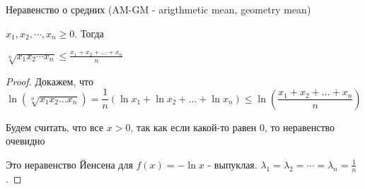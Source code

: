 \begin{theorem}
    Неравенство о средних (AM-GM - arigthmetic mean, geometry mean)

    $x_1, x_2, \cdots, x_n \geqslant 0$. Тогда

    $\sqrt[n]{x_1x_2\cdots x_n} \leqslant \frac{x_1+x_2+\dots+x_n}{n}$
\end{theorem}

\begin{proof}
    Докажем, что \[\ln (\sqrt[n]{x_1x_2\dots x_n}) = \frac{1}{n}(\ln x_1 + \ln x_2 + \dots + \ln x_n) 
    \leqslant \ln (\frac{x_1+x_2+\dots+x_n}{n})\]

    Будем считать, что все $x > 0$, так как если какой-то равен 0, то неравенство очевидно

    
    Это неравенство Йенсена для $f(x) = -\ln x$ - выпуклая.
    $\lambda_1 = \lambda_2 = \cdots = \lambda_n = \frac{1}{n} $.
\end{proof}